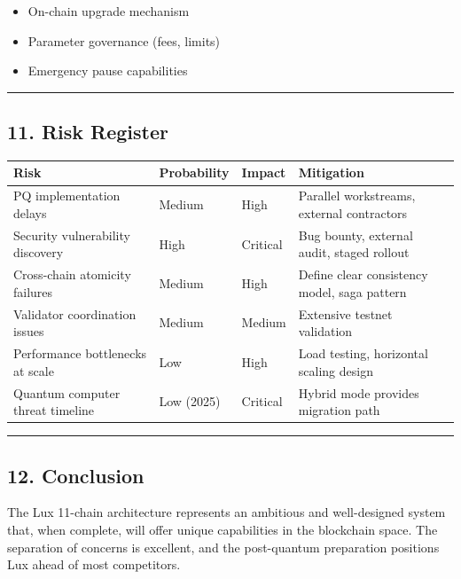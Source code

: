 \documentclass[
]{article}
\newcounter{none} %
\providecommand{\tightlist}{%
  \setlength{\itemsep}{0pt}\setlength{\parskip}{0pt}}
\begin{document}
\begin{itemize}
\tightlist
\item[$\square$]
  On-chain upgrade mechanism
\item[$\square$]
  Parameter governance (fees, limits)
\item[$\square$]
  Emergency pause capabilities
\end{itemize}

\begin{center}\rule{0.5\linewidth}{0.5pt}\end{center}

\subsection{11. Risk Register}\label{11-risk-register}

{\def\LTcaptype{none} %
\begin{longtable}[]{@{}llll@{}}
\toprule\noalign{}
Risk & Probability & Impact & Mitigation \\
\midrule\noalign{}
\endhead
\bottomrule\noalign{}
\endlastfoot
PQ implementation delays & Medium & High & Parallel workstreams,
external contractors \\
Security vulnerability discovery & High & Critical & Bug bounty,
external audit, staged rollout \\
Cross-chain atomicity failures & Medium & High & Define clear
consistency model, saga pattern \\
Validator coordination issues & Medium & Medium & Extensive testnet
validation \\
Performance bottlenecks at scale & Low & High & Load testing, horizontal
scaling design \\
Quantum computer threat timeline & Low (2025) & Critical & Hybrid mode
provides migration path \\
\end{longtable}
}

\begin{center}\rule{0.5\linewidth}{0.5pt}\end{center}

\subsection{12. Conclusion}\label{12-conclusion}

The Lux 11-chain architecture represents an ambitious and well-designed
system that, when complete, will offer unique capabilities in the
blockchain space. The separation of concerns is excellent, and the
post-quantum preparation positions Lux ahead of most competitors.
\end{document}
